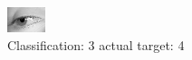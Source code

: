\begin{figure}[h!]
\begin{center}
\includegraphics[width=0.60\columnwidth]{figures/ID2968_class_3_target_4.png}
\end{center}
\caption{ Classification: 3 actual target: 4}
\label{fig:ID2968_class_3_target_4}
\end{figure}

